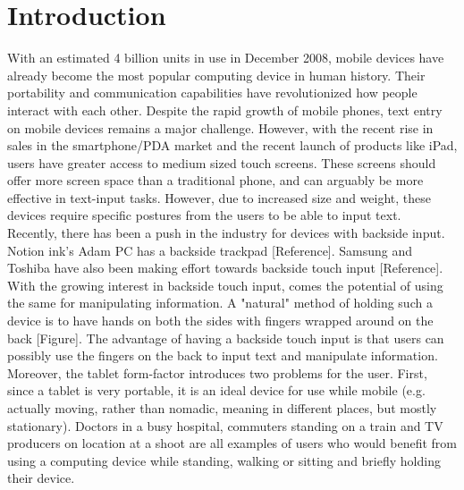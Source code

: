 \section{Introduction}
With an estimated 4 billion units in use in December 2008, mobile devices have already become the most popular computing device in human history. Their portability and
communication capabilities have revolutionized how people
interact with each other. Despite the rapid growth
of mobile phones, text entry on mobile devices remains a
major challenge. However, with the recent rise in sales in the smartphone/PDA market and the recent launch of products like iPad, users have greater access to medium sized touch screens. These screens should offer more screen space than a traditional phone, and can arguably be more effective in text-input tasks. However, due to increased size and weight, these devices require specific postures from the users to  be able to input text.\\
Recently, there has been a push in the industry for devices with backside input. Notion ink's Adam PC has a backside trackpad [Reference]. Samsung and Toshiba have also been making effort towards backside touch input [Reference]. With the growing interest in backside touch input, comes the potential of using the same for manipulating information. A "natural" method of holding such a device is to have hands on both the sides with fingers wrapped around on the back [Figure]. The advantage of having a backside touch input is that users can possibly use the fingers on the back to input text and manipulate information.\\  
Moreover, the tablet form-factor introduces two problems for the user.  First, since a tablet is very portable, it is an ideal device for use while mobile (e.g. actually moving, rather than nomadic, meaning in different places, but mostly stationary).  Doctors in a busy hospital, commuters standing on a train and TV producers on location at a shoot are all examples of users who would benefit from using a computing device while standing, walking or sitting and briefly holding their device.\\
